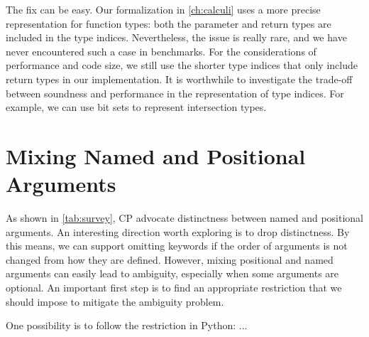 The fix can be easy. Our formalization in \autoref{ch:calculi} uses a more
precise representation for function types: both the parameter and return types
are included in the type indices. Nevertheless, the issue is really rare, and we
have never encountered such a case in benchmarks. For the considerations of
performance and code size, we still use the shorter type indices that only
include return types in our implementation. It is worthwhile to investigate the
trade-off between soundness and performance in the representation of type
indices. For example, we can use bit sets to represent intersection types.

\section{Mixing Named and Positional Arguments}

As shown in \autoref{tab:survey}, CP advocate distinctness between named and
positional arguments. An interesting direction worth exploring is to drop
distinctness. By this means, we can support omitting keywords if the order of
arguments is not changed from how they are defined. However, mixing positional
and named arguments can easily lead to ambiguity, especially when some arguments
are optional. An important first step is to find an appropriate restriction that
we should impose to mitigate the ambiguity problem.

One possibility is to follow the restriction in Python: ...

